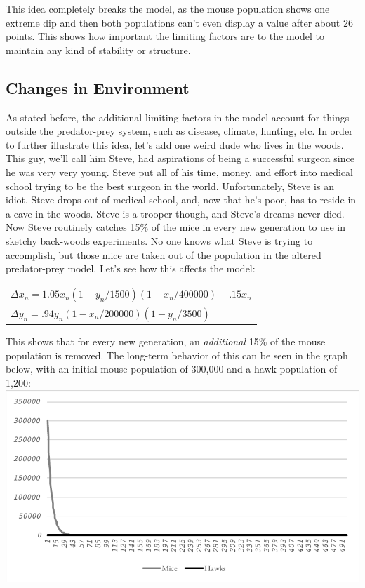 \documentclass[10pt,letterpaper]{article}
\begin{document}
			\newline \newline
			This idea completely breaks the model, as the mouse population shows one extreme dip and then both populations can't even display a value after about 26 points. This shows how important the limiting factors are to the model to maintain any kind of stability or structure. 
		\subsection{Changes in Environment}
			As stated before, the additional limiting factors in the model account for things outside the predator-prey system, such as disease, climate, hunting, etc. In order to further illustrate this idea, let's add one weird dude who lives in the woods. This guy, we’ll call him Steve, had aspirations of being a successful surgeon since he was very very young. Steve put all of his time, money, and effort into medical school trying to be the best surgeon in the world. Unfortunately, Steve is an idiot. Steve drops out of medical school, and, now that he's poor, has to reside in a cave in the woods. Steve is a trooper though, and Steve's dreams never died. Now Steve routinely catches 15\% of the mice in every new generation to use in sketchy back-woods experiments. No one knows what Steve is trying to accomplish, but those mice are taken out of the population in the altered predator-prey model.
			\newline \newline
			Let's see how this affects the model:
			\begin{center}
				\begin{tabular}{l}
					$\Delta x_{n} = 1.05 x_{n} (1 - y_{n} / 1500) (1 - x_{n} / 400000) - .15 x_{n}$ \\
					$\Delta y_{n} = .94 y_{n} (1 - x_{n} / 200000) (1 - y_{n} / 3500)$ \\
				 \end{tabular}
			\end{center}
			This shows that for every new generation, an \emph{additional} 15\% of the mouse population is removed. The long-term behavior of this can be seen in the graph below, with an initial mouse population of 300,000 and a hawk population of 1,200:
			\newline \newline 
			\includegraphics[width=\textwidth]{graph7.pdf}
\end{document}
